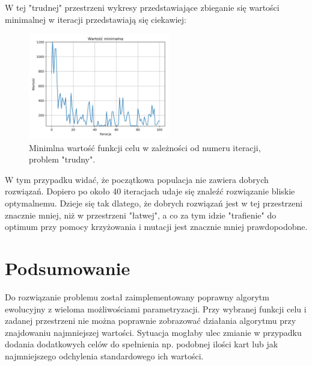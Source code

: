 \documentclass[12pt]{article}
\begin{document}
W tej "trudnej" przestrzeni wykresy przedstawiające zbieganie się wartości minimalnej w iteracji przedstawiają się ciekawiej:
\begin{figure}[H]
	\centering					\includegraphics[width=0.55\textwidth]{one_group.png}
	\caption{Minimlna wartość funkcji celu w zależności od numeru iteracji, problem "trudny".}
	\label{fig1}
\end{figure}
W tym przypadku widać, że początkowa populacja nie zawiera dobrych rozwiązań. Dopiero po około 40 iteracjach udaje się znaleźć rozwiązanie bliskie optymalnemu. Dzieje się tak dlatego, że dobrych rozwiązań jest w tej przestrzeni znacznie mniej, niż w przestrzeni "łatwej", a co za tym idzie "trafienie" do optimum przy pomocy krzyżowania i mutacji jest znacznie mniej prawdopodobne.

\section{Podsumowanie}
Do rozwiązanie problemu został zaimplementowany poprawny algorytm ewolucyjny z wieloma możliwościami parametryzacji. Przy wybranej funkcji celu i zadanej przestrzeni nie można poprawnie zobrazować działania algorytmu przy znajdowaniu najmniejszej wartości. Sytuacja mogłaby ulec zmianie w przypadku dodania dodatkowych celów do spełnienia np. podobnej ilości kart lub jak najmniejszego odchylenia standardowego ich wartości.  
 
\end{document}
